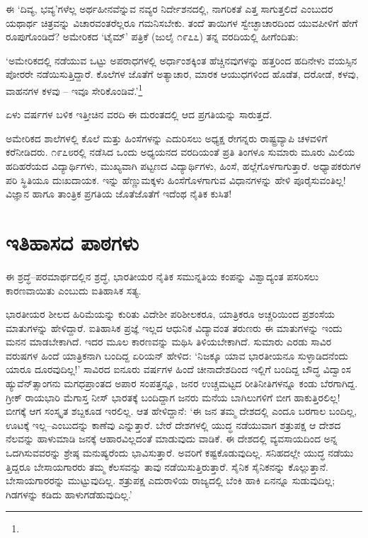 ಈ ‘ದಿವ್ಯ, ಭವ್ಯ’ಗಳೆಲ್ಲ ಅರ್ಥಹೀನವೆನ್ನುವ ನವ್ಯರ ನಿರ್ದೇಶನದಲ್ಲಿ, ನಾಗರಿಕತೆ ಎತ್ತ ಸಾಗುತ್ತಲಿದೆ ಎಂಬುದರ ಯಥಾರ್ಥ ಚಿತ್ರವನ್ನು ವಿಚಾರವಂತರೆಲ್ಲರೂ ಗಮನಿಸಬೇಕು. ತಂದೆ ತಾಯಿಗಳ ಸ್ವೇಚ್ಛಾಚಾರದಿಂದ ಯುವಪೀಳಿಗೆ ಹೇಗೆ ರೂಪುಗೊಂಡಿದೆ? ಅಮೇರಿಕದ ‘ಟೈಮ್​’ ಪತ್ರಿಕೆ (ಜುಲೈ ೧೯೭೭) ತನ್ನ ವರದಿಯಲ್ಲಿ ಹೀಗೆಂದಿತು:

‘ಅಮೇರಿಕದಲ್ಲಿ ನಡೆಯುವ ಒಟ್ಟು ಅಪರಾಧಗಳಲ್ಲಿ ಅರ್ಧಾಂಶಕ್ಕಿಂತ ಹೆಚ್ಚಿನವುಗಳನ್ನು ಹತ್ತರಿಂದ ಹದಿನೇಳು ವಯಸ್ಸಿನ ಪೋರರೇ ನಡೆಯಿಸುತ್ತಿದ್ದಾರೆ. ಕೊಲೆಗಳ ಜೊತೆಗೆ ಅತ್ಯಾಚಾರ, ಮಾರಕ ಆಯುಧಗಳಿಂದ ಹೊಡೆತ, ದರೋಡೆ, ಕಳವು, ವಾಹನಗಳ ಕಳವು – ಇವೂ ಸೇರಿ\-ಕೊಂಡಿವೆ.’\footnote{}

ಏಳು ವರ್ಷಗಳ ಬಳಿಕ ಇತ್ತೀಚಿನ ವರದಿ ಈ ದುರಂತದಲ್ಲಿ ಆದ ಪ್ರಗತಿಯನ್ನು ಸಾರುತ್ತದೆ.

ಅಮೇರಿಕದ ಶಾಲೆಗಳಲ್ಲಿ ಕೊಲೆ ಮತ್ತು ಹಿಂಸೆಗಳನ್ನು ಎದುರಿಸಲು ಅಧ್ಯಕ್ಷ ರೇಗನ್ನರು ರಾಷ್ಟ್ರವ್ಯಾಪಿ ಚಳವಳಿಗೆ ಕರೆನೀಡಿದರು. ೧೯೭೮ರಲ್ಲಿ ನಡೆಸಿದ ಒಂದು ಅಧ್ಯಯನದ ವರದಿಯಂತೆ ಪ್ರತಿ ತಿಂಗಳೂ ಸುಮಾರು ಮೂರು ಮಿಲಿಯ ಹದಿಹರೆಯದ ವಿದ್ಯಾರ್ಥಿಗಳು, ಮುಖ್ಯವಾಗಿ ಪಟ್ಟಣದ ವಿದ್ಯಾರ್ಥಿಗಳು, ಹಿಂಸೆ, ಹಲ್ಲೆಗೊಳಗಾಗುತ್ತಾರೆ. ಅಧ್ಯಾಪಕರುಗಳ ಪರಿ ಸ್ಥಿತಿಯೂ ದುಃಖದಾಯಕ. ಇನ್ನು ಹೆಣ್ಣುಮಕ್ಕಳು ಹಿಂಸೆಗೊಳಗಾಗುವ ವಿಧಾನಗಳನ್ನು ಹೇಳಿ ಪೂರೈಸುವಂತಿಲ್ಲ! ವಿಜ್ಞಾನ ಹಾಗೂ ತಾಂತ್ರಿಕ ಪ್ರಗತಿಯ ಜೊತೆಜೊತೆಗೆ ಇದೆಂಥ ನೈತಿಕ ಕುಸಿತ!


\section*{ಇತಿಹಾಸದ ಪಾಠಗಳು}


ಈ ಶ್ರದ್ಧೆ–ಪರಮಾರ್ಥದಲ್ಲಿನ ಶ್ರದ್ಧೆ, ಭಾರತೀಯರ ನೈತಿಕ ಸಮುನ್ನತಿಯ ಕಂಪನ್ನು ವಿಶ್ವಾದ್ಯಂತ ಪಸರಿಸಲು ಕಾರಣವಾಯಿತು ಎಂಬುದು ಐತಿಹಾಸಿಕ ಸತ್ಯ.

ಭಾರತೀಯರ ಶೀಲದ ಹಿರಿಮೆಯನ್ನು ಕುರಿತು ವಿದೇಶೀ ಪರಿಶೀಲಕರೂ, ಯಾತ್ರಿಕರೂ ಅಚ್ಚರಿಯಿಂದ ಪ್ರಶಂಸೆಯ ಮಾತುಗಳನ್ನು ಹೇಳಿದ್ದಾರೆ. ಐತಿಹಾಸಿಕ ಪ್ರಜ್ಞೆ ಇಲ್ಲದ ಆಧುನಿಕ ವಿದ್ಯಾವಂತ ತರುಣರು ಈ ಮಾತುಗಳನ್ನು ಇಂದು ಮನನ ಮಾಡಬೇಕಾಗಿದೆ. ಇದರ ಮೂಲ ಕಾರಣವನ್ನು ಮಥಿಸಿ ತಿಳಿಯಬೇಕಾಗಿದೆ. ಸುಮಾರು ಎರಡು ಸಾವಿರ ವರುಷಗಳ ಹಿಂದೆ ಯಾತ್ರಿಕನಾಗಿ ಬಂದಿದ್ದ ಏರಿಯನ್ ಹೇಳಿದ: ‘ನಿಜಕ್ಕೂ ಯಾವ ಭಾರತೀಯನೂ ಸುಳ್ಳಾಡಿದನೆಂದು ಯಾರೂ ದೂರವುದಿಲ್ಲ!’ ಸಾವಿರದ ಐನೂರು ವರ್ಷಗಳ ಹಿಂದೆ ಚೀನಾದೇಶದಿಂದ ಇಲ್ಲಿಗೆ ಬಂದಿದ್ದ ಬೌದ್ಧ ವಿದ್ವಾಂಸ ಹ್ಯುವೆನ್​ತ್ಸಾಂಗನು ಮಗಧಪ್ರಾಂತದ ಅಪಾರ ಸಂಪತ್ತನ್ನೂ, ಜನರ ಉಚ್ಚಮಟ್ಟದ ರೀತಿನೀತಿಗಳನ್ನೂ ಕಂಡು ಬೆರಗಾಗಿದ್ದ. ಗ್ರೀಕ್ ರಾಯಭಾರಿ ಮೆಗಾಸ್ತ ನೀಸ್ ಭಾರತಕ್ಕೆ ಬಂದಿದ್ದಾಗ ಜನರು ಮನೆಯ ಬಾಗಿಲುಗಳಿಗೆ ಬೀಗ ಹಾಕುತ್ತಿರಲಿಲ್ಲ! ಬೀಗಕ್ಕೆ ಆಗ ಸಂಸ್ಕೃತ ಶಬ್ದಕೂಡ ಇರಲಿಲ್ಲ. ಆತ ಹೇಳಿದ್ದಾನೆ: ‘ಈ ಜನ ತಮ್ಮ ದೇಶದಲ್ಲಿ ಎಂದೂ ಬರಗಾಲ ಬಂದಿಲ್ಲ, ಊಟಕ್ಕೆ ಇಲ್ಲ–ಎಂಬುದನ್ನು ಕಾಣೆವು ಎನ್ನುತ್ತಾರೆ. ಬೇರೆ ದೇಶಗಳಲ್ಲಿ ಯುದ್ಧ ನಡೆಯುವಾಗ ಶತ್ರುಪಕ್ಷ ಆ ದೇಶದ ನೆಲವನ್ನು ಹಾಳುಮಾಡಿ ಜನಕ್ಕೆ ಆಹಾರವಿಲ್ಲದಂತೆ ಮಾಡುವುದು ವಾಡಿಕೆ. ಈ ದೇಶದಲ್ಲಿ ವ್ಯವಸಾಯದಿಂದ ಅನ್ನ ಒದಗಿಸುವವರನ್ನು ಶ್ರೇಷ್ಠ ಮನುಷ್ಯರೆಂದು ಭಾವಿಸುತ್ತಾರೆ. ಅವರಿಗೆ ಕಷ್ಟಕೊಡುವುದಿಲ್ಲ. ಸನಿಹದಲ್ಲೇ ಯುದ್ಧ ನಡೆಯು ತ್ತಿದ್ದರೂ ಬೇಸಾಯಗಾರರು ತಮ್ಮ ಕೆಲಸವನ್ನು ತಾವು ನಡೆಯಿಸುತ್ತಿರುತ್ತಾರೆ. ಸೈನಿಕ ಸೈನಿಕನನ್ನು ಕೊಲ್ಲುತ್ತಾನೆ. ಬೇಸಾಯಗಾರರನ್ನು ಮುಟ್ಟುವುದಿಲ್ಲ. ಶತ್ರುಪಕ್ಷ ಎದುರಾಳಿಯ ರಾಜ್ಯದಲ್ಲಿ ಬೆಂಕಿ ಹಾಕಿ ಏನನ್ನೂ ಸುಡುವುದಿಲ್ಲ; ಗಿಡಗಳನ್ನು ಕಡಿದು ಹಾಳುಗಡೆಹುವುದಿಲ್ಲ.’


